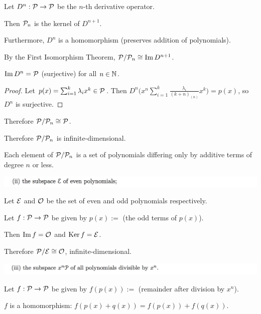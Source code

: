 \documentclass[12pt]{article}
\begin{document}
Let $D^n:\mathcal P \to \mathcal P$ be the $n$-th derivative operator.

Then $\mathcal P_n$ is the kernel of $D^{n+1}$.

Furthermore, $D^n$ is a homomorphism (preserves addition of polynomials).

By the First Isomorphism Theorem, $\mathcal P/\mathcal P_n \cong \operatorname{\mathrm{Im}} D^{n+1}$.

\begin{claim*}
  $\operatorname{\mathrm{Im}} D^n = \mathcal P$ (surjective) for all $n \in \mathbb{N}$.
\end{claim*}

\begin{proof}
  Let $p(x) = \sum_{i=1}^k\lambda_ix^k \in \mathcal P$. Then
  $D^n \Big(x^n\sum_{i=1}^k\frac{\lambda_i}{(k+n)_{(n)}}x^k\Big) = p(x)$, so $D^n$ is surjective.
\end{proof}

Therefore $\mathcal P/\mathcal P_n \cong \mathcal P$.

Therefore $\mathcal P/\mathcal P_n$ is infinite-dimensional.

\begin{remark*}
Each element of $\mathcal P/\mathcal P_n$ is a set of polynomials differing only by additive terms
of degree $n$ or less.
\end{remark*}

\begin{mdframed}
\includegraphics[width=400pt]{img/linear-algebra-a0-2-2-2.png}
\end{mdframed}
Let $\mathcal E$ and $\mathcal O$ be the set of even and odd polynomials respectively.

Let $f:\mathcal P \to \mathcal P$ be given by $p(x) := $ (the odd terms of $p(x)$).

Then $\operatorname{\mathrm{Im}} f = \mathcal O$ and $\operatorname{\mathrm{Ker}} f = \mathcal E$.

Therefore $\mathcal P/\mathcal E \cong \mathcal O$, infinite-dimensional.


\begin{mdframed}
\includegraphics[width=400pt]{img/linear-algebra-a0-2-2-3.png}
\end{mdframed}
Let $f: \mathcal P \to \mathcal P$ be given by $f(p(x)) := $ (remainder after division by $x^n$).

\begin{claim*}
  $f$ is a homomorphism: $f(p(x) + q(x)) = f(p(x)) + f(q(x))$.
\end{claim*}
\end{document}

